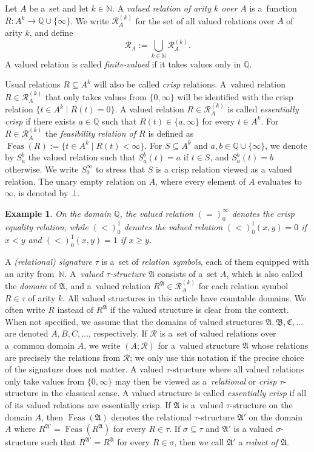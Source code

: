 \documentclass[preprint,12pt]{elsarticle}
\newcommand{\Q}{\mathbb Q}
\newcommand{\bA}{{\mathfrak A}}
\newcommand{\bB}{{\mathfrak B}}
\newcommand{\bC}{{\mathfrak C}}
\DeclareMathOperator{\Feas}{Feas}
\newtheorem{example}[theorem]{Example}
\begin{document}
Let $A$ be a~set and let $k \in {\mathbb N}$. 
A \emph{valued relation of arity $k$ over $A$}
is a~function $R \colon A^k \to {\mathbb Q} \cup \{\infty\}$.  
We write ${\mathscr R}_A^{(k)}$ for the set of all valued relations over $A$ of arity $k$, and define \[{\mathscr R}_A := \bigcup_{k \in {\mathbb N}} {\mathscr R}_A^{(k)}.\]
A valued relation is called \emph{finite-valued} if it takes values only in $\Q$.

Usual relations $R \subseteq A^k$ will also be called \emph{crisp} relations.
A~valued relation $R \in {\mathscr R}_A^{(k)}$ that only takes values from $\{0,\infty\}$ will be identified with the crisp relation 
$\{t \in A^k \mid R(t) = 0\}.$
%
A valued relation $R \in {\mathscr R}_A^{(k)}$ is called \emph{essentially crisp} if 
there exists $a \in \Q$ such that $R(t) \in \{a, \infty\}$ for every $t \in A^k$.
%
For $R \in {\mathscr R}_A^{(k)}$ the \emph{feasibility relation of $R$} is defined as
$ \Feas(R) := \{t \in A^k \mid R(t) < \infty\}.$
%
For $S \subseteq A^k$ and $a,b \in {\mathbb Q} \cup \{\infty\}$, we denote by $S_a^b$ the valued relation such that $S_a^b(t) = a$ if $t \in S$, and $S_a^b(t) = b$ otherwise.
We write $S_0^\infty$ to stress that $S$ is a crisp relation viewed as a valued relation. 
The unary empty relation on $A$, where every element of $A$ evaluates to $\infty$, is denoted by $\bot$.

\begin{example}
On the domain $\Q$, the valued relation $(=)_0^\infty$  denotes the crisp equality relation, while $(<)_0^1$ denotes the valued relation $(<)_0^1(x,y) = 0$ if $x < y$ and $(<)_0^1(x,y) = 1$ if $x \geq y$. 
\end{example}

A \emph{(relational) signature} $\tau$ is a~set of \emph{relation symbols}, each of them equipped with an arity from~${\mathbb N}$. A~\emph{valued $\tau$-structure} $\bA$ consists of a~set $A$, which is also called the \emph{domain} of $\bA$, and a~valued relation $R^{\bA} \in {\mathscr R}_A^{(k)}$ for each relation symbol $R \in \tau$ of arity $k$. All valued structures in this article have countable domains. We often write $R$ instead of $R^{\bA}$ if the valued structure is clear from the context. When not specified, we assume that the domains of valued structures $\bA, \bB, \bC, \dots$ are denoted $A, B, C, \dots$, respectively. 
If ${\mathcal R}$ is a~set of valued relations over a~common domain $A$, we write $(A;{\mathcal R})$ for a~valued structure $\bA$ whose relations are precisely the relations from $\mathcal R$; we only use this notation if the precise choice of the signature does not matter.
A valued $\tau$-structure where all valued relations only take values from $\{0,\infty\}$
may then be viewed as a~\emph{relational} or \emph{crisp} $\tau$-structure in the classical sense. A valued structure is called \emph{essentially crisp} if all of its valued relations are essentially crisp. If $\bA$ is a~valued $\tau$-structure on the domain $A$, then $\Feas(\bA)$ denotes the relational $\tau$-structure $\bA'$ on the domain $A$ where $R^{\bA'}=\Feas(R^\bA)$
for every $R\in \tau$. If $\sigma \subseteq \tau$ and $\bA'$ is a valued $\sigma$-structure such that $R^{\bA'} = R^{\bA}$ for every $R \in \sigma$, then we call $\bA'$ a \emph{reduct of $\bA$}.
\end{document}
